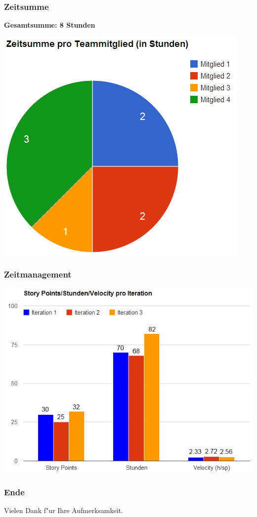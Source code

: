 \documentclass[accentcolor=tud9d,colorbacktitle,inverttitle,landscape,german,presentation,t]{tudbeamer}
\begin{document}
\begin{frame}
	\frametitle{Zeitsumme}
	\textbf{Gesamtsumme: 8 Stunden}
	\begin{center}
		\includegraphics[scale=0.5]{Bilder/zeitsummen.png} \newline
	\end{center}

\end{frame}

\begin{frame}
\frametitle{Zeitmanagement}
	\begin{center}
		\includegraphics[scale=.5]{Bilder/iteration.png}
	\end{center}

\end{frame}

\begin{frame}
\frametitle{Ende}

Vielen Dank f"ur Ihre Aufmerksamkeit.
\end{frame}
\end{document}
